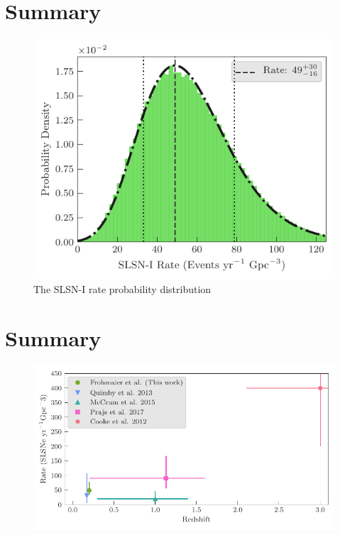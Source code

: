 \documentclass[a4paper,fleqn,usenatbib]{mnras}
\begin{document}
\section{Summary}


\begin{figure}
	\includegraphics[width=\linewidth]{./SLSN_Rate_Dist.pdf}
    \caption{The SLSN-I rate probability distribution}
    \label{fig:SLSNrateProbDist}
\end{figure}



\section{Summary}

\begin{figure}
	\includegraphics[width=\linewidth]{./SLSN_Compare_Literature.pdf}
    \caption{}
    \label{fig:rates_SLSN_Lit}
\end{figure}
\end{document}
